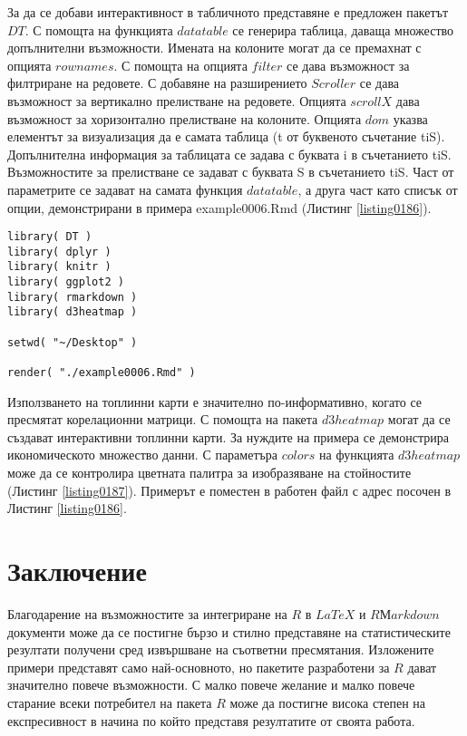 За да се добави интерактивност в табличното представяне е предложен пакетът $DT$. С помощта на функцията $datatable$ се генерира таблица, даваща множество допълнителни възможности. Имената на колоните могат да се премахнат с опцията $rownames$. С помощта на опцията $filter$ се дава възможност за филтриране на редовете. С добавяне на разширението $Scroller$ се дава възможност за вертикално прелистване на редовете. Опцията $scrollX$ дава възможност за хоризонтално прелистване на колоните. Опцията $dom$ указва елементът за визуализация да е самата таблица (t от буквеното съчетание tiS). Допълнителна информация за таблицата се задава с буквата i в съчетанието tiS. Възможностите за прелистване се задават с буквата S в съчетанието tiS. Част от параметрите се задават на самата функция $datatable$, а друга част като списък от опции, демонстрирани в примера example0006.Rmd (Листинг \ref{listing0186}).

\begin{lstlisting}[caption=Създаване на интерактивни документи, label=listing0187]
library( DT )
library( dplyr )
library( knitr )
library( ggplot2 )
library( rmarkdown )
library( d3heatmap )

setwd( "~/Desktop" )

render( "./example0006.Rmd" )
\end{lstlisting}

Използването на топлинни карти е значително по-информативно, когато се пресмятат корелационни матрици. С помощта на пакета $d3heatmap$ могат да се създават интерактивни топлинни карти. За нуждите на примера се демонстрира икономическото множество данни. С параметъра $colors$ на функцията $d3heatmap$ може да се контролира цветната палитра за изобразяване на стойностите (Листинг \ref{listing0187}). Примерът е поместен в работен файл с адрес посочен в Листинг \ref{listing0186}.

\section*{Заключение}

Благодарение на възможностите за интегриране на $R$ в $LaTeX$ и $RМarkdown$ документи може да се постигне бързо и стилно представяне на статистическите резултати получени сред извършване на съответни пресмятания. Изложените примери представят само най-основното, но пакетите разработени за $R$ дават значително повече възможности. С малко повече желание и малко повече старание всеки потребител на пакета $R$ може да постигне висока степен на експресивност в начина по който представя резултатите от своята работа.

